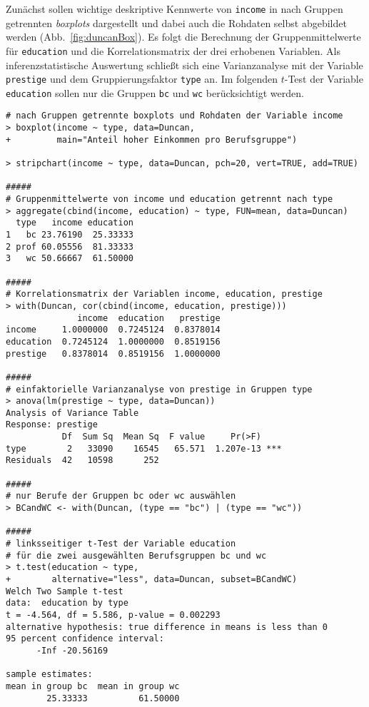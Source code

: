 Zunächst sollen wichtige deskriptive Kennwerte von \lstinline!income! in nach Gruppen getrennten \emph{boxplots} dargestellt und dabei auch die Rohdaten selbst abgebildet werden (Abb.\ \ref{fig:duncanBox}). Es folgt die Berechnung der Gruppenmittelwerte für \lstinline!education! und die Korrelationsmatrix der drei erhobenen Variablen. Als inferenzstatistische Auswertung schließt sich eine Varianzanalyse mit der Variable \lstinline!prestige! und dem Gruppierungsfaktor \lstinline!type! an. Im folgenden $t$-Test der Variable \lstinline!education! sollen nur die Gruppen \lstinline!bc! und \lstinline!wc! berücksichtigt werden.
\begin{lstlisting}
# nach Gruppen getrennte boxplots und Rohdaten der Variable income
> boxplot(income ~ type, data=Duncan,
+         main="Anteil hoher Einkommen pro Berufsgruppe")

> stripchart(income ~ type, data=Duncan, pch=20, vert=TRUE, add=TRUE)

#####
# Gruppenmittelwerte von income und education getrennt nach type
> aggregate(cbind(income, education) ~ type, FUN=mean, data=Duncan)
  type   income education
1   bc 23.76190  25.33333
2 prof 60.05556  81.33333
3   wc 50.66667  61.50000

#####
# Korrelationsmatrix der Variablen income, education, prestige
> with(Duncan, cor(cbind(income, education, prestige)))
              income  education   prestige
income     1.0000000  0.7245124  0.8378014
education  0.7245124  1.0000000  0.8519156
prestige   0.8378014  0.8519156  1.0000000

#####
# einfaktorielle Varianzanalyse von prestige in Gruppen type
> anova(lm(prestige ~ type, data=Duncan))
Analysis of Variance Table
Response: prestige
           Df  Sum Sq  Mean Sq  F value     Pr(>F)
type        2   33090    16545   65.571  1.207e-13 ***
Residuals  42   10598      252

#####
# nur Berufe der Gruppen bc oder wc auswählen
> BCandWC <- with(Duncan, (type == "bc") | (type == "wc"))

#####
# linksseitiger t-Test der Variable education
# für die zwei ausgewählten Berufsgruppen bc und wc
> t.test(education ~ type,
+        alternative="less", data=Duncan, subset=BCandWC)
Welch Two Sample t-test
data:  education by type
t = -4.564, df = 5.586, p-value = 0.002293
alternative hypothesis: true difference in means is less than 0
95 percent confidence interval:
      -Inf -20.56169

sample estimates:
mean in group bc  mean in group wc
        25.33333          61.50000
\end{lstlisting}

